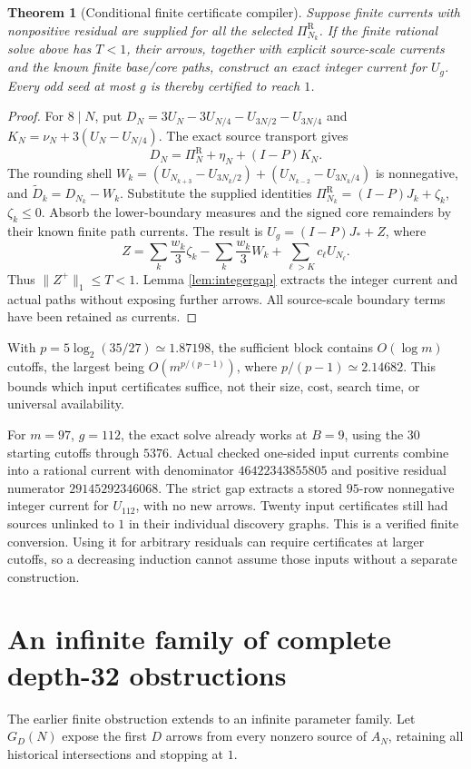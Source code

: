 \documentclass[11pt]{article}
\newtheorem{theorem}{Theorem}
\newcommand{\PiR}{\Pi^{\mathrm R}}
\begin{document}
\begin{theorem}[Conditional finite certificate compiler]\label{thm:finitecompiler}
Suppose finite currents with nonpositive residual are supplied for all
the selected $\PiR_{N_k}$. If the finite rational solve above has $T<1$,
their arrows, together with explicit source-scale currents and the known
finite base/core paths, construct an exact integer current for $U_g$.
Every odd seed at most $g$ is thereby certified to reach $1$.
\end{theorem}
\begin{proof}
For $8\mid N$, put
$D_N=3U_N-3U_{N/4}-U_{3N/2}-U_{3N/4}$ and
$K_N=\nu_N+3(U_N-U_{N/4})$. The exact source transport gives
\[
D_N=\PiR_N+\eta_N+(I-P)K_N.
\]
The rounding shell
$W_k=(U_{N_{k+3}}-U_{3N_k/2})+
      (U_{N_{k-2}}-U_{3N_k/4})$ is nonnegative, and
$\widetilde D_k=D_{N_k}-W_k$.
Substitute the supplied identities
$\PiR_{N_k}=(I-P)J_k+\zeta_k$, $\zeta_k\le0$.
Absorb the lower-boundary measures and the signed core remainders by
their known finite path currents. The result is
$U_g=(I-P)J_*+Z$, where
\[
Z=\sum_k\frac{w_k}{3}\zeta_k-\sum_k\frac{w_k}{3}W_k
        +\sum_{\ell>K}c_\ell U_{N_\ell}.
\]
Thus $\|Z^+\|_1\le T<1$. Lemma \ref{lem:integergap} extracts the
integer current and actual paths without exposing further arrows.
All source-scale boundary terms have been retained as currents.
\end{proof}
With $p=5\log_2(35/27)\simeq1.87198$, the sufficient block contains
$O(\log m)$ cutoffs, the largest being $O(m^{p/(p-1)})$,
where $p/(p-1)\simeq2.14682$. This bounds which input certificates suffice,
not their size, cost, search time, or universal availability.

For $m=97$, $g=112$, the exact solve already works at $B=9$, using the
30 starting cutoffs through $5376$. Actual checked one-sided input
currents combine into a rational current with denominator $46422343855805$
and positive residual numerator $29145292346068$. The strict gap
extracts a stored $95$-row nonnegative integer current for $U_{112}$,
with no new arrows. Twenty input certificates still had sources unlinked
to $1$ in their individual discovery graphs.
This is a verified finite conversion. Using it for arbitrary residuals
can require certificates at larger cutoffs, so a decreasing induction
cannot assume those inputs without a separate construction.

\section{An infinite family of complete depth-32 obstructions}
The earlier finite obstruction extends to an infinite parameter family.
Let $G_D(N)$ expose the first $D$ arrows from every nonzero source of
$A_N$, retaining all historical intersections and stopping at $1$.
\end{document}
